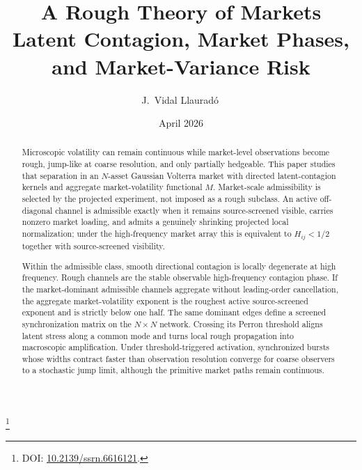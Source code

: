 \documentclass[11pt,a4paper]{amsart}
\theoremstyle{plain}
\theoremstyle{definition}
\theoremstyle{remark}
\begin{document}
\title[A Rough Theory of Markets]{%
A Rough Theory of Markets\\[0.3em]
{\small Latent Contagion, Market Phases,\\[0.15em]
and Market-Variance Risk}}
\author[J.~Vidal Llaurad\'o]{J.~Vidal Llaurad\'o\,}
\thanks{DOI: \href{https://doi.org/10.2139/ssrn.6616121}{10.2139/ssrn.6616121}.}
\date{April 2026}

\begin{abstract}
Microscopic volatility can remain continuous while market-level observations become rough,
jump-like at coarse resolution, and only partially hedgeable.  This paper studies that separation
in an \(N\)-asset Gaussian Volterra market with directed latent-contagion kernels and aggregate
market-volatility functional \(M\).  Market-scale admissibility is selected by the projected
experiment, not imposed as a rough subclass.  An active off-diagonal channel is admissible exactly
when it remains source-screened visible, carries nonzero market loading, and admits a genuinely
shrinking projected local normalization; under the high-frequency market array this is equivalent to
\(H_{ij}<1/2\) together with source-screened visibility.

Within the admissible class, smooth directional contagion is locally degenerate at high frequency.
Rough channels are the stable observable high-frequency contagion phase.  If the market-dominant
admissible channels aggregate without leading-order cancellation, the aggregate market-volatility
exponent is the roughest active source-screened exponent and is strictly below one half.  The same
dominant edges define a screened synchronization matrix on the \(N\times N\) network.  Crossing its
Perron threshold aligns latent stress along a common mode and turns local rough propagation into
macroscopic amplification.  Under threshold-triggered activation, synchronized bursts whose widths
contract faster than observation resolution converge for coarse observers to a stochastic jump
limit, although the primitive market paths remain continuous.


\end{abstract}
\end{document}
